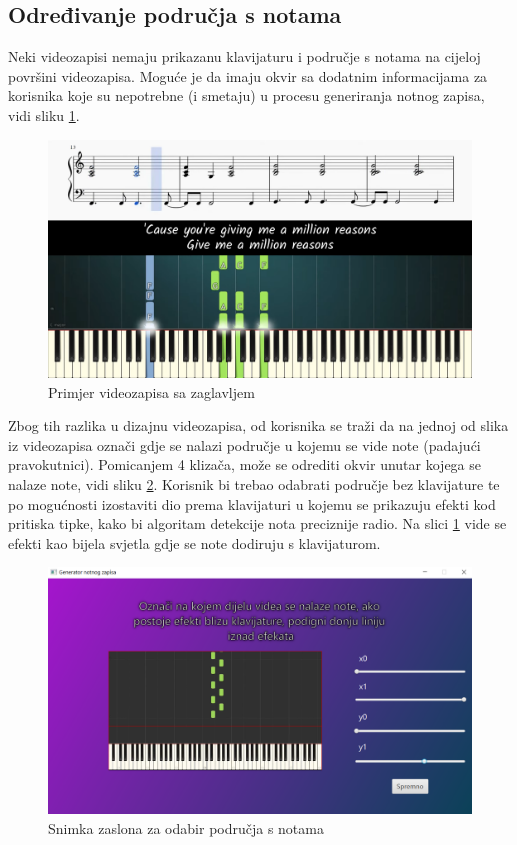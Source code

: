 \documentclass[times, utf8, zavrsni, numeric]{fer}
\begin{document}
\subsection{Određivanje područja s notama}
Neki videozapisi nemaju prikazanu klavijaturu i područje s notama na cijeloj površini videozapisa. Moguće je da imaju okvir sa dodatnim informacijama za korisnika koje su nepotrebne (i smetaju) u procesu generiranja notnog zapisa, vidi sliku \ref{fig:milreasons}.

\begin{figure}[h]
	\includegraphics[scale=0.19]{milreasons.png}
	\centering
	\caption{Primjer videozapisa sa zaglavljem\cite{milreasons}}
	\label{fig:milreasons}
\end{figure}

Zbog tih razlika u dizajnu videozapisa, od korisnika se traži da na jednoj od slika iz videozapisa označi gdje se nalazi područje u kojemu se vide note (padajući pravokutnici). Pomicanjem 4 klizača, može se odrediti okvir unutar kojega se nalaze note, vidi sliku \ref{fig:screen3}. Korisnik bi trebao odabrati područje bez klavijature te po mogućnosti izostaviti dio prema klavijaturi u kojemu se prikazuju efekti kod pritiska tipke, kako bi algoritam detekcije nota preciznije radio. Na slici \ref{fig:milreasons} vide se efekti kao bijela svjetla gdje se note dodiruju s klavijaturom.

\begin{figure}[h]
	\includegraphics[scale=0.43]{screen3.png}
	\centering
	\caption{Snimka zaslona za odabir područja s notama}
	\label{fig:screen3}
\end{figure}
\end{document}
